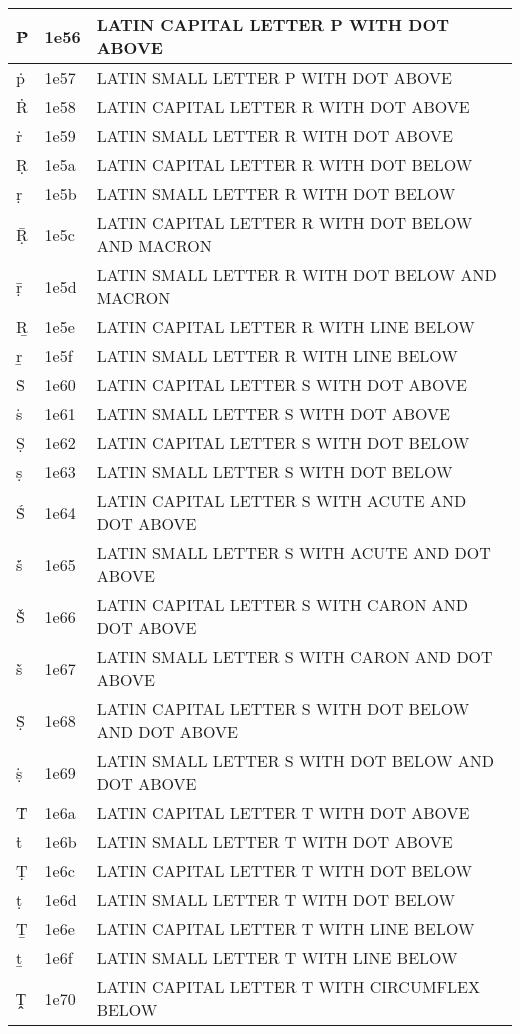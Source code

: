 \documentclass[12pt,letterpaper,openany]{book}
\begin{document}
\begin{center}
\begin{supertabular}{|m{0.25in}|m{0.5in}|m{4in}|}
Ṗ & 1e56 & LATIN CAPITAL LETTER P WITH DOT ABOVE\\\hline
ṗ & 1e57 & LATIN SMALL LETTER P WITH DOT ABOVE\\\hline
Ṙ & 1e58 & LATIN CAPITAL LETTER R WITH DOT ABOVE\\\hline
ṙ & 1e59 & LATIN SMALL LETTER R WITH DOT ABOVE\\\hline
Ṛ & 1e5a & LATIN CAPITAL LETTER R WITH DOT BELOW\\\hline
ṛ & 1e5b & LATIN SMALL LETTER R WITH DOT BELOW\\\hline
Ṝ & 1e5c & LATIN CAPITAL LETTER R WITH DOT BELOW AND MACRON\\\hline
ṝ & 1e5d & LATIN SMALL LETTER R WITH DOT BELOW AND MACRON\\\hline
Ṟ & 1e5e & LATIN CAPITAL LETTER R WITH LINE BELOW\\\hline
ṟ & 1e5f & LATIN SMALL LETTER R WITH LINE BELOW\\\hline
Ṡ & 1e60 & LATIN CAPITAL LETTER S WITH DOT ABOVE\\\hline
ṡ & 1e61 & LATIN SMALL LETTER S WITH DOT ABOVE\\\hline
Ṣ & 1e62 & LATIN CAPITAL LETTER S WITH DOT BELOW\\\hline
ṣ & 1e63 & LATIN SMALL LETTER S WITH DOT BELOW\\\hline
Ṥ & 1e64 & LATIN CAPITAL LETTER S WITH ACUTE AND DOT ABOVE\\\hline
ṥ & 1e65 & LATIN SMALL LETTER S WITH ACUTE AND DOT ABOVE\\\hline
Ṧ & 1e66 & LATIN CAPITAL LETTER S WITH CARON AND DOT ABOVE\\\hline
ṧ & 1e67 & LATIN SMALL LETTER S WITH CARON AND DOT ABOVE\\\hline
Ṩ & 1e68 & LATIN CAPITAL LETTER S WITH DOT BELOW AND DOT ABOVE\\\hline
ṩ & 1e69 & LATIN SMALL LETTER S WITH DOT BELOW AND DOT ABOVE\\\hline
Ṫ & 1e6a & LATIN CAPITAL LETTER T WITH DOT ABOVE\\\hline
ṫ & 1e6b & LATIN SMALL LETTER T WITH DOT ABOVE\\\hline
Ṭ & 1e6c & LATIN CAPITAL LETTER T WITH DOT BELOW\\\hline
ṭ & 1e6d & LATIN SMALL LETTER T WITH DOT BELOW\\\hline
Ṯ & 1e6e & LATIN CAPITAL LETTER T WITH LINE BELOW\\\hline
ṯ & 1e6f & LATIN SMALL LETTER T WITH LINE BELOW\\\hline
Ṱ & 1e70 & LATIN CAPITAL LETTER T WITH CIRCUMFLEX BELOW\\\hline

\end{supertabular}
\end{center}
\end{document}
